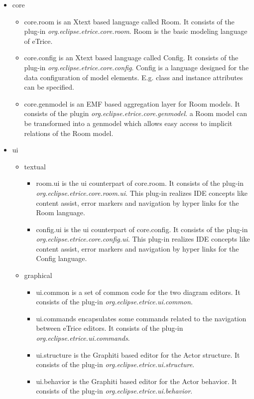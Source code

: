 \begin{itemize}
\item core

\begin{itemize}
\item core.room is an Xtext based language called Room. It consists of the plug-in \textit{org.eclipse.etrice.core.room}. Room is the basic modeling language of eTrice.
\item core.config is an Xtext based language called Config. It consists of the plug-in \textit{org.eclipse.etrice.core.config}. Config is a language designed for the data configuration of model elements. E.g. class and instance attributes can be specified.
\item core.genmodel is an EMF based aggregation layer for Room models. It consists of the plugin \textit{org.eclipse.etrice.core.genmodel}. a Room model can be transformed into a genmodel which allows easy access to implicit relations of the Room model.
\end{itemize}

\item ui
\begin{itemize}
\item textual
\begin{itemize}

\item room.ui is the ui counterpart of core.room.  It consists of the plug-in \textit{org.eclipse.etrice.core.room.ui}. This plug-in realizes IDE concepts like content assist, error markers and navigation by hyper links for the Room language.
\item config.ui is the ui counterpart of core.config.  It consists of the plug-in \textit{org.eclipse.etrice.core.config.ui}. This plug-in realizes IDE concepts like content assist, error markers and navigation by hyper links for the Config language.
\end{itemize}

\item graphical
\begin{itemize}
\item ui.common is a set of common code for the two diagram editors. It consists of the plug-in \textit{org.eclipse.etrice.ui.common}.
\item ui.commands encapsulates some commands related to the navigation between eTrice editors. It consists of the plug-in \textit{org.eclipse.etrice.ui.commands}.
\item ui.structure is the Graphiti based editor for the Actor structure. It consists of the plug-in \textit{org.eclipse.etrice.ui.structure}.
\item ui.behavior is the Graphiti based editor for the Actor behavior. It consists of the plug-in \textit{org.eclipse.etrice.ui.behavior}.
\end{itemize}
\end{itemize}


\end{itemize}

